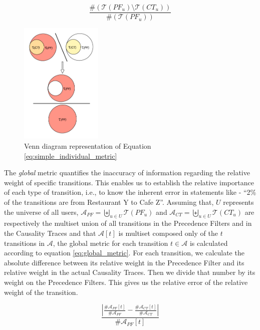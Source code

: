  \begin{equation}
   \label{eq:simple_individual_metric}
   \frac{\# ( \mathcal{T}(PF_u) \setminus \mathcal{T}(CT_u) )}
     {\#(\mathcal{T}(PF_u))}
 \end{equation}

\begin{figure}
  \centering
  \includegraphics[width=0.35\textwidth]{images/venn_diagrams_simple.pdf}
  \caption{Venn diagram representation of Equation \ref{eq:simple_individual_metric}}
  \label{fig:venn_diagram_simple}
\end{figure}

 The \emph{global} metric quantifies the inaccuracy of information
 regarding the relative weight of specific transitions. This enables
 us to establish the relative importance of each type of transition,
 i.e., to know the inherent error in statements like - ``2\% of the
 transitions are from Restaurant Y to Cafe Z''.  Assuming that, $U$
 represents the universe of all users, $\mathcal{A}_{PF} = \biguplus_{u \in
 U} \mathcal{T}(PF_u)$ and $\mathcal{A}_{CT} = \biguplus_{u \in
 U} \mathcal{T}(CT_u)$ are respectively the multiset union of all transitions
in the Precedence Filters and in the Causality Traces and that
$\mathcal{A}[t]$ is multiset composed only of the $t$ transitions in
$\mathcal{A}$, the global metric for each transition $t \in
\mathcal{A}$ is calculated according to equation
\ref{eq:global_metric}. For each transition, we calculate the
absolute difference between its relative weight in the Precedence Filter and
its relative weight in the actual Causality Traces. Then we divide that number
by its weight on the Precedence Filters. This gives us the
relative error of the relative weight of the transition.

\begin{equation}
  \label{eq:global_metric}
   \frac {\left| \frac{ \# \mathcal{A}_{PF}[t]}{\#\mathcal{A}_{PF}} -
    \frac{\#\mathcal{A}_{CT}[t]} {\# \mathcal{A}_{CT} }\right|}
{\#\mathcal{A}_{PF}[t]}
 \end{equation}

